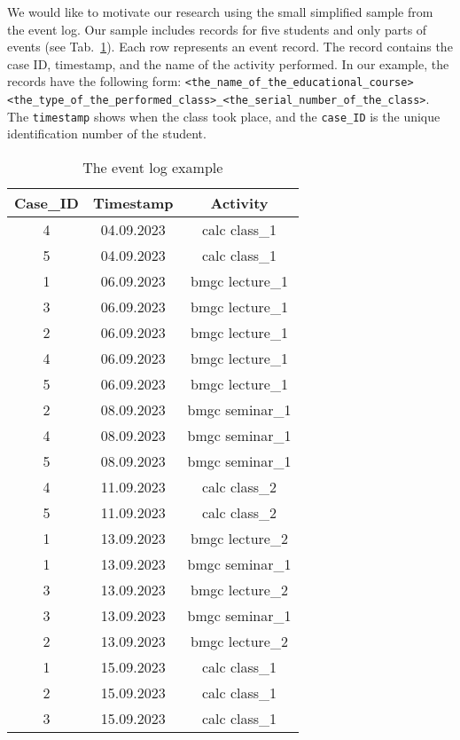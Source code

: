 \documentclass[11pt]{article}
\theoremstyle{definition}
\begin{document}
We would like to motivate our research using the small simplified sample from the event log. 
Our sample includes records for five students and only parts of events (see Tab.~\ref{tbl:example}). 
Each row represents an event record. 
The record contains the case ID, timestamp, and the name of the  activity performed. 
In our example, the  records have the following form: \texttt{<the\_name\_of\_the\_educational\_course> <the\_type\_of\_the\_performed\_class>\_<the\_serial\_number\_of\_the\_class>}. 
The \texttt{timestamp} shows when the class took place, and the \texttt{case\_ID} is the unique identification number of the student.

\begin{table}[htb]
    \centering
    \caption{The event log example}
    
    \begin{tabular}{c c c} 
    \textbf{Case\_ID} & \textbf{Timestamp} & \textbf{Activity} \\ 
    \hline
    \hline
    4 & 04.09.2023 & calc class\_1\\
    \hline
    5 & 04.09.2023 & calc class\_1\\
    \hline
    1 & 06.09.2023 & bmgc lecture\_1\\
    \hline
    3 & 06.09.2023 & bmgc lecture\_1\\
    \hline
    2 & 06.09.2023 & bmgc lecture\_1\\
    \hline
    4 & 06.09.2023 & bmgc lecture\_1\\
    \hline
    5 & 06.09.2023 & bmgc lecture\_1\\
    \hline
    2 & 08.09.2023 & bmgc seminar\_1\\
    \hline
    4 & 08.09.2023 & bmgc seminar\_1\\
    \hline
    5 & 08.09.2023 & bmgc seminar\_1\\
    \hline
    4 & 11.09.2023 & calc class\_2\\
    \hline
    5 & 11.09.2023 & calc class\_2\\
    \hline
    1 & 13.09.2023 & bmgc lecture\_2\\
    \hline
    1 & 13.09.2023 & bmgc seminar\_1\\
    \hline
    3 & 13.09.2023 & bmgc lecture\_2\\
    \hline
    3 & 13.09.2023 & bmgc seminar\_1\\
    \hline
    2 & 13.09.2023 & bmgc lecture\_2\\
    \hline
    1 & 15.09.2023 & calc class\_1\\
    \hline
    2 & 15.09.2023 & calc class\_1\\
    \hline
    3 & 15.09.2023 & calc class\_1\\
    \hline\hline
    \end{tabular}
  \label{tbl:example}
\end{table}
\end{document}
